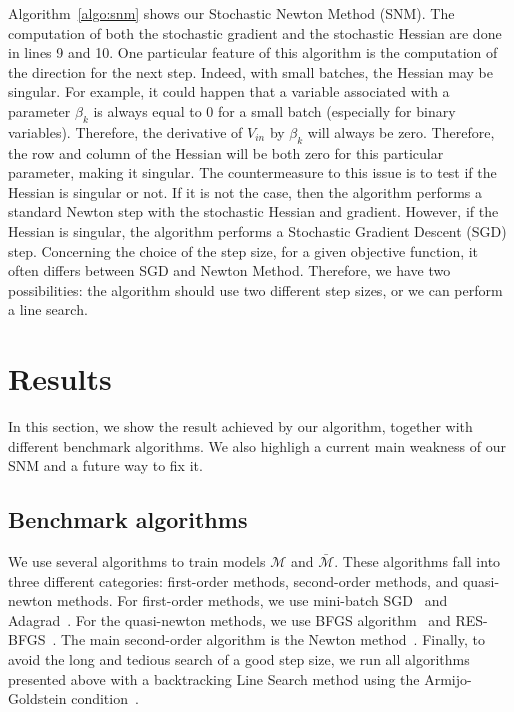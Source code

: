\documentclass[conference]{IEEEtran}
\begin{document}
Algorithm~\ref{algo:snm} shows our Stochastic Newton Method (SNM). The computation of both the stochastic gradient and the stochastic Hessian are done in lines 9 and 10. One particular feature of this algorithm is the computation of the direction for the next step. Indeed, with small batches, the Hessian may be singular. For example, it could happen that a variable associated with a parameter $\beta_k$ is always equal to 0 for a small batch (especially for binary variables). Therefore, the derivative of $V_{in}$ by $\beta_k$ will always be zero. Therefore, the row and column of the Hessian will be both zero for this particular parameter, making it singular. The countermeasure to this issue is to test if the Hessian is singular or not. If it is not the case, then the algorithm performs a standard Newton step with the stochastic Hessian and gradient. However, if the Hessian is singular, the algorithm performs a Stochastic Gradient Descent (SGD) step. Concerning the choice of the step size, for a given objective function, it often differs between SGD and Newton Method. Therefore, we have two possibilities: the algorithm should use two different step sizes, or we can perform a line search.



\section{Results}
\label{sec:res}

In this section, we show the result achieved by our algorithm, together with different benchmark algorithms. We also highligh a current main weakness of our SNM and a future way to fix it.


\subsection{Benchmark algorithms}
\label{sec:algorithms}

We use several algorithms to train models $\mathcal{M}$ and $\bar{\mathcal{M}}$. These algorithms fall into three different categories: first-order methods, second-order methods, and quasi-newton methods. For first-order methods, we use mini-batch SGD~\cite{ruder_overview_2016} and Adagrad~\cite{duchi_adaptive_2011}. For the quasi-newton methods, we use BFGS algorithm~\cite{fletcher_practical_1987} and RES-BFGS~\cite{mokhtari_res:_2014}. The main second-order algorithm is the Newton method~\cite{caswell_treatise_1685}. Finally, to avoid the long and tedious search of a good step size, we run all algorithms presented above with a backtracking Line Search method using the Armijo-Goldstein condition~\cite{armijo_minimization_1966}. \\
\end{document}
